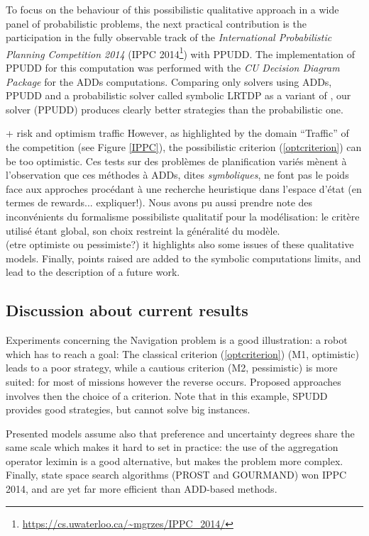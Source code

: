 To focus on the behaviour 
of this possibilistic qualitative approach 
in a wide panel of probabilistic problems, 
the next practical contribution 
is the participation 
in the fully observable track of the 
\textit{International Probabilistic Planning Competition 2014} 
(IPPC 2014\footnote{\url{https://cs.uwaterloo.ca/~mgrzes/IPPC_2014/}})
with PPUDD. 
The implementation of PPUDD for this computation 
was performed with the \textit{CU Decision Diagram Package}
for the ADDs computations. 
Comparing only solvers using ADDs, 
PPUDD and a probabilistic solver called symbolic LRTDP 
as a variant of \cite{Bonet03labeledrtdp:},
our solver (PPUDD) produces clearly better strategies 
than the probabilistic one.

+ risk and optimism traffic
However, as highlighted by the domain ``Traffic''
of the competition (see Figure \ref{IPPC}), 
the possibilistic criterion (\ref{optcriterion})
can be too optimistic.
Ces tests sur des probl\`emes de planification vari\'es m\`enent \`a l'observation que 
ces m\'ethodes \`a ADDs, dites \textit{symboliques}, ne font pas le poids face aux
approches proc\'edant \`a une recherche heuristique dans l'espace d'\'etat \cite{DBLP:conf/aips/KellerE12} (en termes de rewards... expliquer!). 
Nous avons pu aussi prendre note des inconv\'enients du formalisme possibiliste qualitatif pour la mod\'elisation:
le crit\`ere utilis\'e \'etant global, son choix restreint la g\'en\'eralit\'e du mod\`ele.\\
(etre optimiste ou pessimiste?)
it highlights also some issues 
of these qualitative models.
Finally, points raised are added to 
the symbolic computations limits,
and lead to the description
of a future work.


\subsection*{Discussion about current results}
Experiments  
concerning the Navigation problem
is a good illustration: 
a robot which has to
reach a goal:
The classical criterion (\ref{optcriterion})
(M1, optimistic) 
leads to a poor strategy, 
while a cautious criterion (M2, pessimistic)
is more suited: 
for most of missions however 
the reverse occurs.
Proposed approaches involves then 
the choice of a criterion.
Note that in this example, 
SPUDD provides good strategies, but 
cannot solve big instances. 

Presented models 
assume also that preference
and uncertainty degrees
share the same scale
which makes it hard to
set in practice: the use of
the aggregation operator leximin 
is a good alternative,
but makes the problem more complex.
Finally, state space search algorithms
(PROST \cite{conf/aips/KellerE12} and GOURMAND) won IPPC 2014,
and are yet far more efficient than ADD-based methods.

